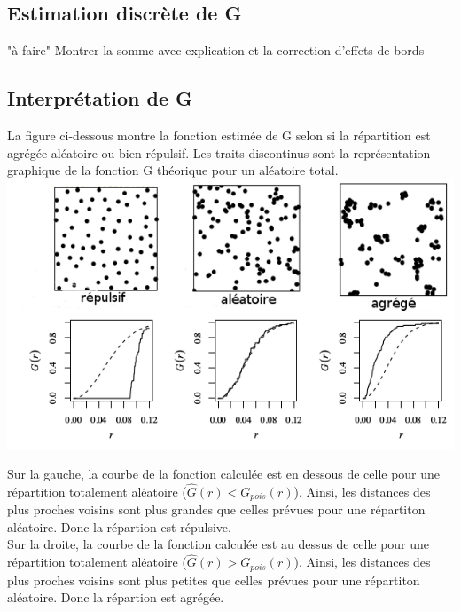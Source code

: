 \documentclass[french,12pt,a4paper]{report}
\begin{document}

\subsection{Estimation discrète de G}
"à faire"
Montrer la somme avec explication et la correction d'effets de bords


\subsection{Interprétation de G }
La figure ci-dessous montre la fonction estimée de G selon si la répartition est agrégée aléatoire ou bien répulsif. Les traits discontinus sont la représentation graphique de la fonction G théorique pour un aléatoire total.\\

\includegraphics[scale=0.7]{images/interpret2.png}

Sur la gauche, la courbe de la fonction calculée est en dessous de celle pour une répartition totalement aléatoire (\begin{math}\hat{G}(r) < G_{pois}(r) \end{math}). Ainsi, les distances des plus proches voisins sont plus grandes que celles prévues pour une répartiton aléatoire. Donc la répartion est répulsive.\\
\indent
Sur la droite, la courbe de la fonction calculée est au dessus de celle pour une répartition totalement aléatoire (\begin{math}\hat{G}(r) > G_{pois}(r) \end{math}). Ainsi, les distances des plus proches voisins sont plus petites que celles prévues pour une répartiton aléatoire. Donc la répartion est agrégée.\\
\end{document}
